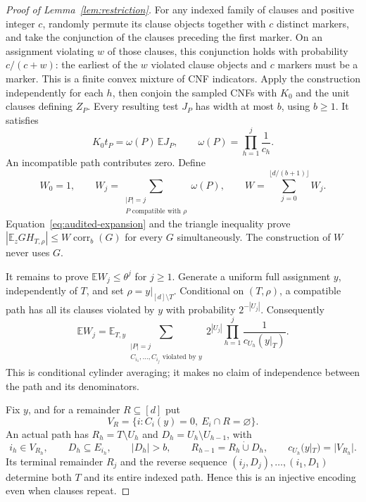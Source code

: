 \documentclass[11pt]{article}
\newcommand{\E}{\mathbb E}
\newcommand{\corr}{\operatorname{corr}}
\begin{document}
\begin{proof}[Proof of Lemma~\ref{lem:restriction}]
For any indexed family of clauses and positive integer $c$, randomly
permute its clause objects together with $c$ distinct markers, and take
the conjunction of the clauses preceding the first marker. On an assignment
violating $w$ of those clauses, this conjunction holds with probability
$c/(c+w)$: the earliest of the $w$ violated clause objects and $c$ markers
must be a marker. This is a finite convex mixture of CNF indicators.
Apply the construction independently for each $h$, then conjoin the sampled
CNFs with $K_0$ and the unit clauses defining $Z_P$. Every resulting test
$J_P$ has width at most $b$, using $b\ge1$. It satisfies
\[
 K_0t_P=\omega(P)\,\E J_P,
 \qquad \omega(P)=\prod_{h=1}^j\frac1{c_h}.
\]
An incompatible path contributes zero. Define
\[
 W_0=1,\qquad
 W_j=\sum_{\substack{|P|=j\\P\text{ compatible with }\rho}}\omega(P),
 \qquad W=\sum_{j=0}^{\lfloor d/(b+1)\rfloor}W_j.
\]
Equation~\eqref{eq:audited-expansion} and the triangle inequality prove
$|\E_zGH_{T,\rho}|\le W\corr_b(G)$ for every $G$ simultaneously.
The construction of $W$ never uses $G$.

It remains to prove $\E W_j\le\theta^j$ for $j\ge1$.
Generate a uniform full assignment $y$, independently of $T$, and set
$\rho=y|_{[d]\setminus T}$. Conditional on $(T,\rho)$, a compatible path
has all its clauses violated by $y$ with probability $2^{-|U_j|}$.
Consequently
\begin{equation}\label{eq:audited-reweight}
 \E W_j=\E_{T,y}
 \sum_{\substack{|P|=j\\C_{i_1},\ldots,C_{i_j}\text{ violated by }y}}
 2^{|U_j|}\prod_{h=1}^j\frac1{c_{U_h}(y|_T)}.
\end{equation}
This is conditional cylinder averaging; it makes no claim of independence
between the path and its denominators.

Fix $y$, and for a remainder $R\subseteq[d]$ put
\[
 V_R=\{i:C_i(y)=0,\ E_i\cap R=\varnothing\}.
\]
An actual path has $R_h=T\setminus U_h$ and
$D_h=U_h\setminus U_{h-1}$, with
\[
 i_h\in V_{R_h},\qquad D_h\subseteq E_{i_h},\qquad |D_h|>b,
 \qquad R_{h-1}=R_h\mathbin{\dot\cup}D_h,\qquad
 c_{U_h}(y|_T)=|V_{R_h}|.
\]
Its terminal remainder $R_j$ and the reverse sequence
$(i_j,D_j),\ldots,(i_1,D_1)$ determine both $T$ and its entire indexed
path. Hence this is an injective encoding even when clauses repeat.


\end{proof}
\end{document}
